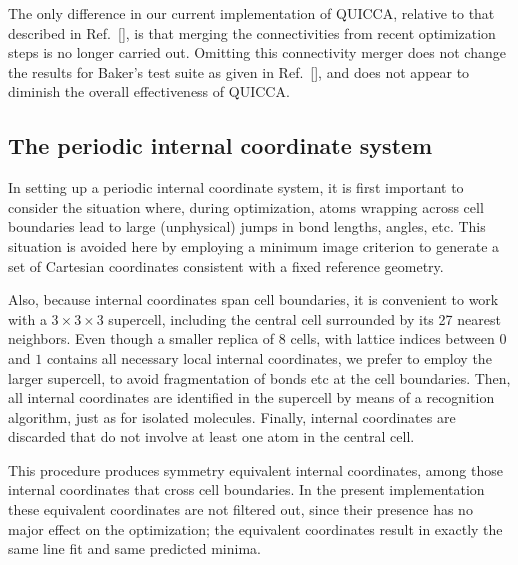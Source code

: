 \twolinestyle{\documentclass[prb,preprint]{revtex4}}
\begin{document}
The only difference in our current implementation of QUICCA, relative
to that described in Ref.~[], is that merging 
the connectivities from recent optimization steps is no longer carried out.
Omitting this connectivity merger does not change the results for Baker's 
test suite as given in Ref.~[], and does not appear
to diminish the overall effectiveness of QUICCA.

\subsection{The periodic internal coordinate system}

In setting up a periodic internal coordinate system, it is first 
important to consider the situation where, during optimization, atoms 
wrapping across cell boundaries lead to large (unphysical) jumps in 
bond lengths, angles, etc.  This situation is avoided here by employing a minimum 
image criterion to generate a set of Cartesian coordinates consistent 
with a fixed reference geometry.  

Also, because internal coordinates span cell boundaries, it is 
convenient to work with a $3\times3\times3$ supercell,
including the central cell surrounded by its 27 nearest neighbors.
Even though a smaller replica of 8 cells, with lattice indices
between $0$ and $1$ contains all necessary local internal coordinates,
we prefer to employ the larger supercell, to avoid fragmentation
of bonds etc at the cell boundaries.  Then, all internal coordinates 
are identified in the supercell by means of a recognition algorithm,
just as for isolated molecules.  Finally, internal coordinates are discarded 
that do not involve at least one atom in the central cell. 

This procedure produces symmetry equivalent internal coordinates, 
among those internal coordinates that cross cell boundaries.
In the present implementation these equivalent coordinates are not 
filtered out, since their presence has no major effect on the optimization;
the equivalent coordinates result in exactly the same line fit and same
predicted minima.
\end{document}
